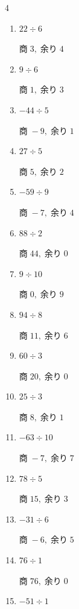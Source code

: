 \begin{multicols}{4}
\begin{enumerate}
        $商\; 6,\; 余り\; 6$

  \item $22 \div 6$

        $商\; 3,\; 余り\; 4$

  \item $9 \div 6$

        $商\; 1,\; 余り\; 3$

  \item $-44 \div 5$

        $商\; -9,\; 余り\; 1$

  \item $27 \div 5$

        $商\; 5,\; 余り\; 2$

  \item $-59 \div 9$

        $商\; -7,\; 余り\; 4$

  \item $88 \div 2$

        $商\; 44,\; 余り\; 0$

  \item $9 \div 10$

        $商\; 0,\; 余り\; 9$

  \item $94 \div 8$

        $商\; 11,\; 余り\; 6$

  \item $60 \div 3$

        $商\; 20,\; 余り\; 0$

  \item $25 \div 3$

        $商\; 8,\; 余り\; 1$

\columnbreak %

  \item $-63 \div 10$

        $商\; -7,\; 余り\; 7$

  \item $78 \div 5$

        $商\; 15,\; 余り\; 3$

  \item $-31 \div 6$

        $商\; -6,\; 余り\; 5$

  \item $76 \div 1$

        $商\; 76,\; 余り\; 0$

  \item $-51 \div 1$


\end{enumerate}
\end{multicols}
